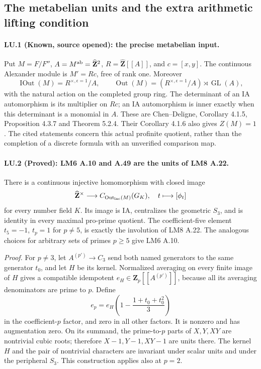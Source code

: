 
\subsection{The metabelian units and the extra arithmetic lifting condition}

\paragraph{LU.1 (Known, source opened): the precise metabelian input.}
Put $M=F/F''$, $A=M^{\rm ab}=\widehat{\mathbf Z}^2$,
$R=\widehat{\mathbf Z}[[A]]$, and $c=[x,y]$. The continuous
Alexander module is $M'=Rc$, free of rank one. Moreover
\[
 \operatorname{IOut}(M)=R^{\times,\epsilon=1}/A,
 \qquad
 \operatorname{Out}(M)=
 (R^{\times,\epsilon=1}/A)\rtimes\operatorname{GL}(A),
\]
with the natural action on the completed group ring. The
determinant of an IA automorphism is its multiplier on $Rc$;
an IA automorphism is inner exactly when this determinant is a
monomial in $A$. These are Chen--Deligne, Corollary 4.1.5,
Proposition 4.3.7 and Theorem 5.2.4. Their Corollary 4.1.6 also
gives $Z(M)=1$. The cited statements concern this actual
profinite quotient, rather than the completion of a discrete
formula with an unverified comparison map.

\paragraph{LU.2 (Proved): LM6 A.10 and A.49 are the units of LM8 A.22.}
There is a continuous injective homomorphism with closed image
\[
 \widehat{\mathbf Z}^{\times}\longrightarrow
 C_{\operatorname{Out}_{\rm lac}(M)}(G_K),\quad
 t\longmapsto[\phi_t]
\]
for every number field $K$. Its image is IA, centralizes the
geometric $S_3$, and is identity in every maximal pro-prime
quotient. The coefficient-five element $t_5=-1$, $t_p=1$ for
$p\ne5$, is exactly the involution of LM8 A.22. The analogous
choices for arbitrary sets of primes $p\ge5$ give LM6 A.10.

\emph{Proof.}
For $p\ne3$, let $A^{(p')}\to C_3$ send both named generators
to the same generator $t_0$, and let $H$ be its kernel.
Normalized averaging on every finite image of $H$ gives a
compatible idempotent $e_H\in\mathbf Z_p[[A^{(p')}]]$, because
all its averaging denominators are prime to $p$. Define
\[
 e_p=e_H\left(1-\frac{1+t_0+t_0^2}{3}\right)
\]
in the coefficient-$p$ factor, and zero in all other factors.
It is nonzero and has augmentation zero. On its summand,
the prime-to-$p$ parts of $X,Y,XY$ are nontrivial cubic roots;
therefore $X-1,Y-1,XY-1$ are units there. The kernel $H$ and
the pair of nontrivial characters are invariant under scalar
units and under the peripheral $S_3$. This construction applies
also at $p=2$.

